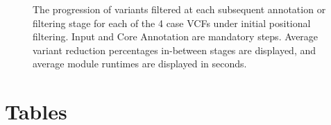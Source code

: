 \documentclass[twocolumn]{bmcart}%
\def\texttt{[image: ]}
\begin{document}
\begin{backmatter}
\begin{figure}[h!]
{\label{fig3}}
\end{figure}
\begin{figure}[h!]
\caption{\csentence{}The progression of variants filtered at each subsequent annotation or filtering stage for each of the 4 case VCFs under initial positional filtering. Input and Core Annotation are mandatory steps. Average variant reduction percentages in-between stages are displayed, and average module runtimes are displayed in seconds.\label{fig4}}
\end{figure}



\section*{Tables}


\end{backmatter}
\end{document}
